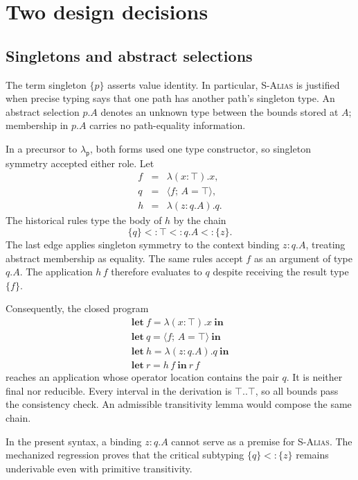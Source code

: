 \documentclass[acmsmall,screen,nonacm]{acmart}
\newcommand{\lambdap}{\ensuremath{\lambda_{\mathsf p}}}
\newcommand{\sing}[1]{\{#1\}}
\newcommand{\pairval}[3]{\langle #1;\,#2=#3\rangle}
\begin{document}
\section{Two design decisions}
\label{sec:pairs}

\subsection{Singletons and abstract selections}

The term singleton \(\sing{p}\) asserts value identity. In particular,
\textsc{S-Alias} is justified when precise typing says that one path has
another path's singleton type. An abstract selection \(p.A\) denotes an
unknown type between the bounds stored at \(A\); membership in \(p.A\)
carries no path-equality information.

In a precursor to \lambdap{}, both forms used one type constructor, so
singleton symmetry accepted either role. Let
\[
\begin{array}{rcl}
f &=& \lambda(x:\top).x,\\
q &=& \pairval{f}{A}{\top},\\
h &=& \lambda(z:q.A).q.
\end{array}
\]
The historical rules type the body of \(h\) by the chain
\[
  \sing{q}<:\top<:q.A<:\sing{z}.
\]
The last edge applies singleton symmetry to the context binding \(z:q.A\),
treating abstract membership as equality. The same rules accept \(f\) as an
argument of type \(q.A\). The application \(h\,f\) therefore evaluates to
\(q\) despite receiving the result type \(\sing{f}\).

Consequently, the closed program
\[
\begin{array}{l}
\mathbf{let}\ f=\lambda(x:\top).x\ \mathbf{in}\\
\mathbf{let}\ q=\pairval{f}{A}{\top}\ \mathbf{in}\\
\mathbf{let}\ h=\lambda(z:q.A).q\ \mathbf{in}\\
\mathbf{let}\ r=h\,f\ \mathbf{in}\ r\,f
\end{array}
\]
reaches an application whose operator location contains the pair \(q\). It is
neither final nor reducible. Every interval in the derivation is
\(\top..\top\), so all bounds pass the consistency check. An admissible
transitivity lemma would compose the same chain.

In the present syntax, a binding \(z:q.A\) cannot serve as a premise for
\textsc{S-Alias}. The mechanized regression proves that the critical
subtyping \(\sing{q}<:\sing{z}\) remains underivable even with primitive
transitivity.
\end{document}
